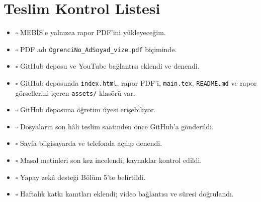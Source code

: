\documentclass[12pt,a4paper]{article}
\begin{document}
\appendix
\section{Teslim Kontrol Listesi}
\begin{itemize}
\item $\square$ MEBİS'e yalnızca rapor PDF'ini yükleyeceğim.
\item $\square$ PDF adı \texttt{OgrenciNo\_AdSoyad\_vize.pdf} biçiminde.
\item $\square$ GitHub deposu ve YouTube bağlantısı eklendi ve denendi.
\item $\square$ GitHub deposunda \texttt{index.html}, rapor PDF'i, \texttt{main.tex}, \texttt{README.md} ve rapor görsellerini içeren \texttt{assets/} klasörü var.
\item $\square$ GitHub deposuna öğretim üyesi erişebiliyor.
\item $\square$ Dosyaların son hâli teslim saatinden önce GitHub'a gönderildi.
\item $\square$ Sayfa bilgisayarda ve telefonda açılıp denendi.
\item $\square$ Masal metinleri son kez incelendi; kaynaklar kontrol edildi.
\item $\square$ Yapay zekâ desteği Bölüm 5'te belirtildi.
\item $\square$ Haftalık katkı kanıtları eklendi; video bağlantısı ve süresi doğrulandı.
\end{itemize}
\end{document}
